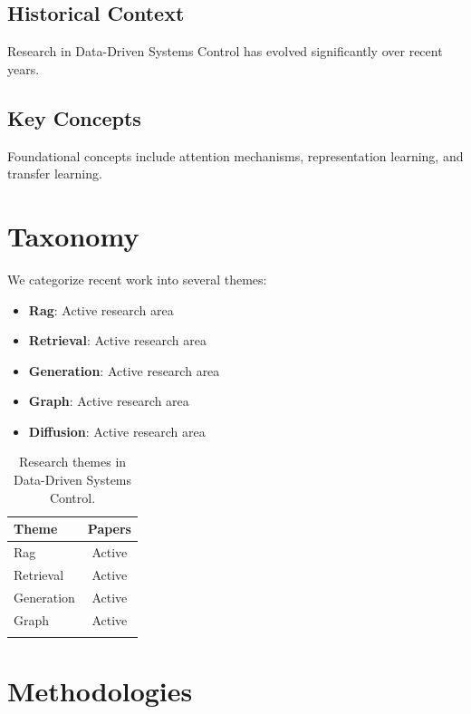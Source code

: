 \documentclass[11pt,a4paper]{article}
\begin{document}
\subsection{Historical Context}

Research in Data-Driven Systems Control has evolved significantly over recent years.

\subsection{Key Concepts}

Foundational concepts include attention mechanisms, representation learning, and transfer learning.



\section{Taxonomy}

We categorize recent work into several themes:

\begin{itemize}
    \item \textbf{Rag}: Active research area
    \item \textbf{Retrieval}: Active research area
    \item \textbf{Generation}: Active research area
    \item \textbf{Graph}: Active research area
    \item \textbf{Diffusion}: Active research area
\end{itemize}

\begin{table}[t]
\centering
\caption{Research themes in Data-Driven Systems Control.}
\begin{tabular}{@{}lc@{}}
\toprule
\textbf{Theme} & \textbf{Papers} \\ \midrule
    Rag & Active \\
    Retrieval & Active \\
    Generation & Active \\
    Graph & Active \\ \\ \bottomrule
\end{tabular}
\end{table}



\section{Methodologies}
\end{document}
